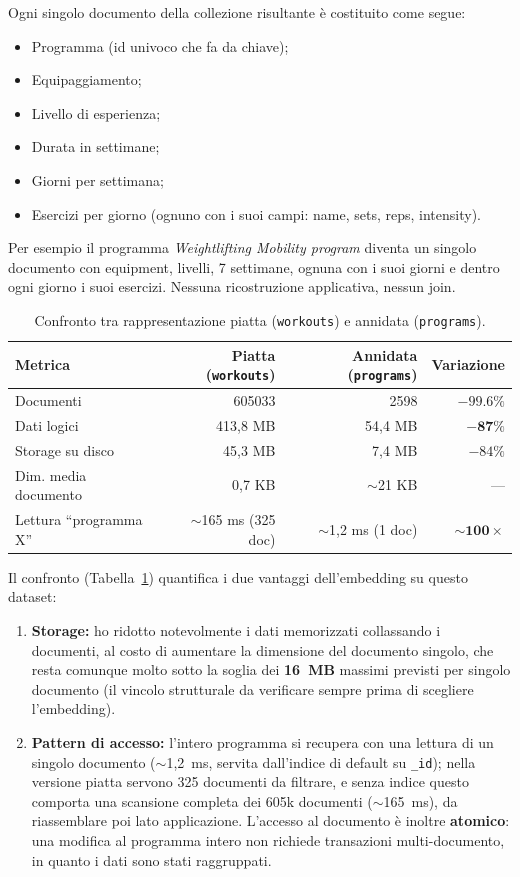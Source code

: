\documentclass{article}
\begin{document}
Ogni singolo documento della collezione risultante è costituito come segue:
\begin{itemize}
    \item Programma (id univoco che fa da chiave);
    \item Equipaggiamento;
    \item Livello di esperienza;
    \item Durata in settimane;
    \item Giorni per settimana;
    \item Esercizi per giorno (ognuno con i suoi campi: name, sets, reps,
    intensity).
\end{itemize}
Per esempio il programma \emph{Weightlifting Mobility program} diventa un singolo
documento con equipment, livelli, 7 settimane, ognuna con i suoi giorni e dentro
ogni giorno i suoi esercizi. Nessuna ricostruzione applicativa, nessun join.

\begin{table}[H]
\centering
\caption{Confronto tra rappresentazione piatta (\texttt{workouts}) e annidata
(\texttt{programs}).}
\label{tab:storage}
\begin{tabular}{lrrr}
\toprule
Metrica & Piatta (\texttt{workouts}) & Annidata (\texttt{programs}) & Variazione \\
\midrule
Documenti              & \num{605033} & \num{2598} & $-99.6\%$ \\
Dati logici            & 413{,}8 MB   & 54{,}4 MB  & $\mathbf{-87\%}$ \\
Storage su disco       & 45{,}3 MB    & 7{,}4 MB   & $-84\%$ \\
Dim. media documento   & 0{,}7 KB     & $\sim$21 KB & --- \\
Lettura ``programma X''& $\sim$165 ms (325 doc) & $\sim$1{,}2 ms (1 doc) & $\mathbf{\sim 100\times}$ \\
\bottomrule
\end{tabular}
\end{table}

Il confronto (Tabella~\ref{tab:storage}) quantifica i due vantaggi dell'embedding
su questo dataset:
\begin{enumerate}
    \item \textbf{Storage:} ho ridotto notevolmente i dati memorizzati collassando
    i documenti, al costo di aumentare la dimensione del documento singolo, che
    resta comunque molto sotto la soglia dei \textbf{16~MB} massimi previsti per
    singolo documento (il vincolo strutturale da verificare sempre prima di
    scegliere l'embedding).
    \item \textbf{Pattern di accesso:} l'intero programma si recupera con una
    lettura di un singolo documento ($\sim$1{,}2~ms, servita dall'indice di default
    su \texttt{\_id}); nella versione piatta servono 325 documenti da filtrare, e
    senza indice questo comporta una scansione completa dei 605k documenti
    ($\sim$165~ms), da riassemblare poi lato applicazione. L'accesso al documento è
    inoltre \textbf{atomico}: una modifica al programma intero non richiede
    transazioni multi-documento, in quanto i dati sono stati raggruppati.
\end{enumerate}
\end{document}
